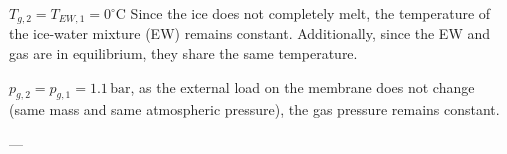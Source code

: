 \( T_{g,2} = T_{EW,1} = 0^\circ \text{C} \)  
Since the ice does not completely melt, the temperature of the ice-water mixture (EW) remains constant. Additionally, since the EW and gas are in equilibrium, they share the same temperature.  

\( p_{g,2} = p_{g,1} = 1.1 \, \text{bar} \), as the external load on the membrane does not change (same mass and same atmospheric pressure), the gas pressure remains constant.  

---